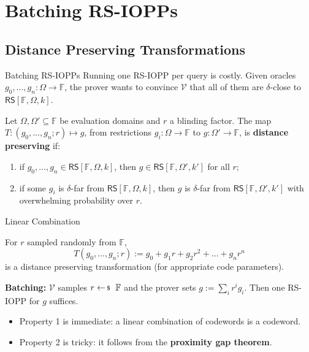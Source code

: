 \documentclass{zkdl-presentation-template}
\begin{document}
    \section{Batching RS-IOPPs}

    \subsection{Distance Preserving Transformations}

    \begin{frame}{Batching RS-IOPPs}
        Running one RS-IOPP per query is costly. Given oracles $g_0,\dots,g_n: \Omega \to \mathbb{F}$, the prover wants to convince $\mathcal{V}$ that all of them are $\delta$-close to $\mathsf{RS}[\mathbb{F},\Omega,k]$.
        \pause

        \begin{definition}
            Let $\Omega,\Omega' \subseteq \mathbb{F}$ be evaluation domains and $r$ a blinding factor. The map $T: (g_0,\dots,g_n;r) \mapsto g$, from restrictions $g_i: \Omega \to \mathbb{F}$ to $g: \Omega' \to \mathbb{F}$, is \textbf{distance preserving} if:
            \begin{enumerate}
                \item if $g_0,\dots,g_n \in \mathsf{RS}[\mathbb{F},\Omega,k]$, then $g \in \mathsf{RS}[\mathbb{F},\Omega',k']$ for all $r$;
                \item if some $g_i$ is $\delta$-far from $\mathsf{RS}[\mathbb{F},\Omega,k]$, then $g$ is $\delta$-far from $\mathsf{RS}[\mathbb{F},\Omega',k']$ with overwhelming probability over $r$.
            \end{enumerate}
        \end{definition}
    \end{frame}

    \begin{frame}{Linear Combination}
        \begin{example}
            For $r$ sampled randomly from $\mathbb{F}$,
            \begin{equation*}
                T(g_0,\dots,g_n;r) := g_0 + g_1r + g_2r^2 + \dots + g_nr^n
            \end{equation*}
            is a distance preserving transformation (for appropriate code parameters).
        \end{example}
        \pause

        \textbf{Batching:} $\mathcal{V}$ samples $r \leftarrowS \mathbb{F}$ and the prover sets \textcolor{oc-blue-8}{$g := \sum_{i} r^ig_i$}. Then one RS-IOPP for $g$ suffices.
        \pause
        \begin{itemize}
            \item Property 1 is immediate: a linear combination of codewords is a codeword.\pause
            \item Property 2 is tricky: it follows from the \textbf{proximity gap theorem}.
        \end{itemize}
    \end{frame}
\end{document}
